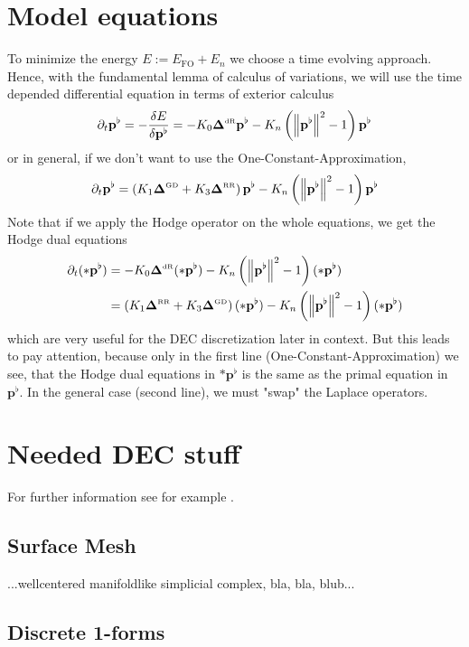 \documentclass[a4paper,11pt]{scrartcl}
\newcommand{\pfl}{\mathbf{p}^{\flat}}
\newcommand{\EOS}{E_{\text{FO}}}
\newcommand{\EN}{E_{n}}
\newcommand{\LB}{\boldsymbol{\Delta}^{\text{\tiny RR}}}
\newcommand{\LCB}{\boldsymbol{\Delta}^{\text{\tiny GD}}}
\newcommand{\LDR}{\boldsymbol{\Delta}^{\text{\tiny dR}}}
\begin{document}
\section{Model equations}
  To minimize the energy \( E := \EOS + \EN \) we choose a time evolving approach. 
  Hence, with the fundamental lemma of calculus of variations, we will use the time depended differential equation in terms of exterior
  calculus
  \begin{align} \label{eqPOC}
    \partial_{t}\pfl = -\frac{\delta E}{\delta\pfl}
                     = -K_{0}\LDR\pfl - K_{n} \left( \left\| \pfl \right\|^{2} - 1 \right)\pfl
  \end{align}
  or in general, if we don't want to use the One-Constant-Approximation,
  \begin{align} \label{eqP}
    \partial_{t}\pfl = \left( K_{1}\LCB + K_{3}\LB\right)\pfl - K_{n} \left( \left\| \pfl \right\|^{2} - 1 \right)\pfl
  \end{align}
  Note that if we apply the Hodge operator on the whole equations, we get the Hodge dual equations
  \begin{align}
    \label{eqDOC}
    \partial_{t}(*\pfl) &= -K_{0}\LDR (*\pfl) - K_{n} \left( \left\| \pfl \right\|^{2} - 1 \right)(*\pfl) \\
    \label{eqD}
                        &=  \left( K_{1}\LB + K_{3}\LCB\right) (*\pfl) - K_{n} \left( \left\| \pfl \right\|^{2} - 1 \right)(*\pfl)
  \end{align}
  which are very useful for the DEC discretization later in context.
  But this leads to pay attention, because only in the first line (One-Constant-Approximation) we see, 
  that the Hodge dual equations in \( *\pfl \) is the same as the primal equation in \( \pfl \). 
  In the general case (second line), we must "swap" the Laplace operators.



\section{Needed DEC stuff}
  
For further information see for example \cite{whitney,hirani}. 

  \subsection{Surface Mesh}
    ...wellcentered manifoldlike simplicial complex, bla, bla, blub...

  \subsection{Discrete 1-forms}
\end{document}
